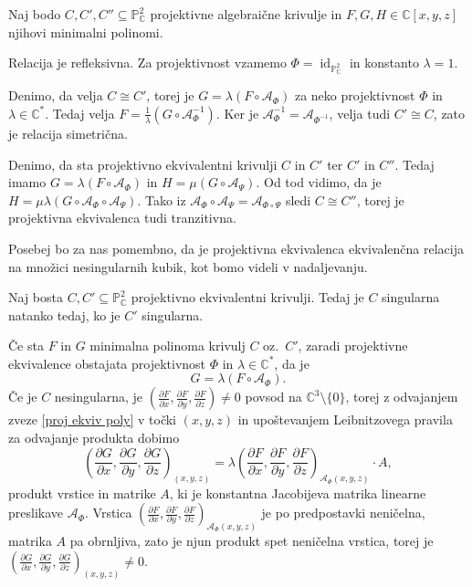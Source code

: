 \documentclass[mat1]{fmfdelo}
\numberwithin{equation}{section}
\newcommand{\C}{\mathbb C}
\newcommand{\CM}{\mathbb C ^*}
\newcommand{\PC}{\mathbb{P}^2_\C}
\newcommand{\Cxyz}{\C[x,y,z]}
\newcommand{\inv}{^{-1}}
\newcommand{\pdv}[2][]{\frac{\partial#1}{\partial#2}}
\DeclareMathOperator{\id}{id}
\theoremstyle{definition}
\begin{document}
\begin{dokaz}
    Naj bodo $C, C', C''\subseteq \PC$ projektivne algebraične krivulje in $F, G, H \in \Cxyz$ njihovi minimalni polinomi. 
    \par Relacija je refleksivna. Za projektivnost vzamemo $\Phi = \id_{\PC}$ in konstanto $\lambda = 1$. 
    \par Denimo, da velja $C \cong C'$, torej je $G = \lambda (F \circ \mathcal{A}_\Phi)$ za neko projektivnost $\Phi$ in $\lambda \in \CM$. Tedaj velja $F = \frac{1}{\lambda} (G \circ \mathcal{A}_\Phi\inv)$. Ker je $\mathcal{A}_\Phi\inv = \mathcal{A}_{\Phi\inv}$, velja tudi $C' \cong C$, zato je relacija simetrična. 
    \par Denimo, da sta projektivno ekvivalentni krivulji $C$ in $C'$ ter $C'$ in $C''$. Tedaj imamo $G = \lambda (F \circ \mathcal{A}_\Phi)$ in $H = \mu (G \circ \mathcal{A}_\Psi)$. Od tod vidimo, da je $H = \mu\lambda(G \circ \mathcal{A}_\Phi \circ \mathcal{A}_\Psi)$. Tako iz $\mathcal{A}_\Phi \circ \mathcal{A}_\Psi = \mathcal{A}_{\Phi \circ \Psi}$ sledi $C \cong C''$, torej je projektivna ekvivalenca tudi tranzitivna. 
\end{dokaz}

Posebej bo za nas pomembno, da je projektivna ekvivalenca ekvivalenčna relacija na množici nesingularnih kubik, kot bomo videli v nadaljevanju. 

\begin{trditev}
    Naj bosta $C, C' \subseteq \PC$ projektivno ekvivalentni krivulji. Tedaj je $C$ singularna natanko tedaj, ko je $C'$ singularna. 
\end{trditev}

\begin{dokaz}
    Če sta $F$ in $G$ minimalna polinoma krivulj $C$ oz.\ $C'$, zaradi projektivne ekvivalence obstajata projektivnost $\Phi$ in $\lambda \in \CM$, da je
    \begin{equation}
        \label{proj ekviv poly}
        G = \lambda (F \circ \mathcal{A}_\Phi).
    \end{equation}
    Če je $C$ nesingularna, je $\left(\pdv[F]{x}{}, \pdv[F]{y}{}, \pdv[F]{z}{}\right) \neq 0$ povsod na $\C^3\setminus\{0\}$, torej z odvajanjem zveze \ref{proj ekviv poly} v točki $(x,y,z)$ in upoštevanjem Leibnitzovega pravila za odvajanje produkta dobimo
    \[
        \left(\pdv[G]{x}{}, \pdv[G]{y}{}, \pdv[G]{z}{}\right)_{(x,y,z)} = 
        \lambda \left(\pdv[F]{x}{}, \pdv[F]{y}{}, \pdv[F]{z}{}\right)_{\mathcal{A}_\Phi (x,y,z)} \cdot A,
    \]
    produkt vrstice in matrike $A$, ki je konstantna Jacobijeva matrika linearne preslikave $\mathcal{A}_\Phi$. Vrstica $\left(\pdv[F]{x}{}, \pdv[F]{y}{}, \pdv[F]{z}{}\right)_{\mathcal{A}_\Phi (x,y,z)}$ je po predpostavki neničelna, matrika $A$ pa obrnljiva, zato je njun produkt spet neničelna vrstica, torej je $\left(\pdv[G]{x}{}, \pdv[G]{y}{}, \pdv[G]{z}{}\right)_{(x,y,z)} \neq 0$. 
\end{dokaz}
\end{document}
